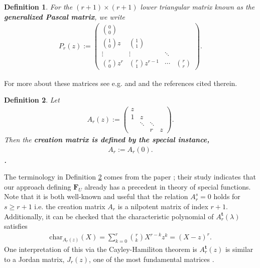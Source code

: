 \documentclass[11pt]{article}
\newtheorem{defin}{Definition}
\begin{document}
    \begin{defin}
        For the $ (r+1)\times(r+1) $ lower triangular matrix known as the \textbf{generalized Pascal matrix}, we write
            \begin{eqnarray*}
                P_r(z) := 
                    \begin{pmatrix}
                        \binom{0}{0} \\
                        \binom{1}{0}z & \binom{1}{1} \\
                        \vdots &\vdots & \ddots \\
                        \binom{r}{0}z^r & \binom{r}{1}z^{r-1} & \cdots & \binom{r}{r} 
                    \end{pmatrix}.
                \end{eqnarray*}
            \end{defin}
For more about these matrices see e.g. \cite{acetoTriguante2001} and \cite{edelmanStrang2004} and the references cited therein.  
    \begin{defin}\label{def:creationMatrix}
        Let
            \begin{eqnarray*}
                A_r(z) := 
                    \begin{pmatrix}
                         z  \\
                        1 & z  \\
                        & \ddots & \ddots &  \\
                        & & r& z
                    \end{pmatrix}.
            \end{eqnarray*}
        Then the \bf creation matrix \normalfont is defined by the special instance,  
        \begin{eqnarray}
              A_r := A_r(0).
        \end{eqnarray}. 
    \end{defin}
    
The terminology in Definition \ref{def:creationMatrix} comes from the paper \cite{acetoMalonekTomaz2015}; their study indicates that our approach defining $ \mathbf{F}_U $ already has a precedent in theory of special functions. Note that it is both well-known and useful that the relation $A_r^{s} = {0}$ holds for $ s \geq r + 1 $ i.e. the creation matrix $ A_r $ is a nilpotent matrix of index $ r+1 $. Additionally, it can be checked that the characteristic polynomial of $ A_r^{\mathbf{t}}(\lambda) $ satisfies
    \begin{eqnarray*}
        \text{{char}}_{A_r(z)}(X) = \sum^{r}_{k=0}\binom{r}{k}X^{r-k}z^k = (X - z)^r.
    \end{eqnarray*}
One interpretation of this via the Cayley-Hamiliton theorem is $ A_r^{\mathbf{t}}(z) $ is similar to a Jordan matrix, $ J_r(z) $, one of the most fundamental matrices \cite{hornJohnson1985}.
    
\end{document}
